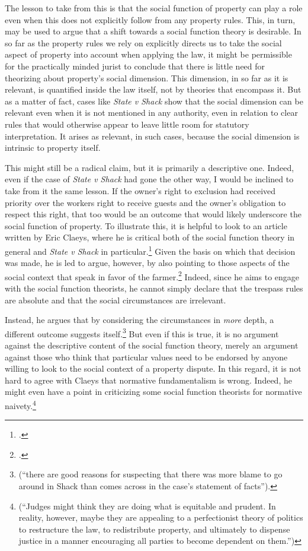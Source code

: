 \documentclass[12pt,a4paper]{book} %
\begin{document}
The lesson to take from this is that the social function of property can play a role even when this does not explicitly follow from any property rules. This, in turn, may be used to argue that a shift towards a social function theory is desirable. In so far as the property rules we rely on explicitly directs us to take the social aspect of property into account when applying the law, it might be permissible for the practically minded jurist to conclude that there is little need for theorizing about property's social dimension. This dimension, in so far as it is relevant, is quantified inside the law itself, not by theories that encompass it. But as a matter of fact, cases like {\it State v Shack} show that the social dimension can be relevant even when it is not mentioned in any authority, even in relation to clear rules that would otherwise appear to leave little room for statutory interpretation. It arises as relevant, in such cases, because the social dimension is intrinsic to property itself. 

This might still be a radical claim, but it is primarily a descriptive one. Indeed, even if the case of {\it State v Shack} had gone the other way, I would be inclined to take from it the same lesson. If the owner's right to exclusion had received priority over the workers right to receive guests and the owner's obligation to respect this right, that too would be an outcome that would likely underscore the social function of property. To illustrate this, it is helpful to look to an article written by Eric Claeys, where he is critical both of the social function theory in general and {\it State v Shack} in particular.\footcite{claeys09} Given the basis on which that decision was made, he is led to argue, however, by also pointing to those aspects of the social context that speak in favor of the farmer.\footnote{\cite[941-942]{claeys09}.} Indeed, since he aims to engage with the social function theorists, he cannot simply declare  that the trespass rules are absolute and that the social circumstances are irrelevant. 

Instead, he argues that by considering the circumstances in {\it more} depth, a different outcome suggests itself.\footnote{\cite[941]{claeys09} (``there are good reasons for suspecting that there was more blame to go around in Shack than comes across in the case's statement of facts'').} But even if this is true, it is no argument against the descriptive content of the social function theory, merely an argument against those who think that particular values need to be endorsed by anyone willing to look to the social context of a property dispute. In this regard, it is not hard to agree with Claeys that normative fundamentalism is wrong. Indeed, he might even have a point in criticizing some social function theorists for normative naivety.\footnote{\cite[945]{claeys09} (``Judges might think they are doing what is equitable and prudent. In reality, however, maybe
they are appealing to a perfectionist theory of politics to restructure the law, to redistribute property, and ultimately to dispense justice in a manner encouraging all parties to become dependent on them.'')} 
\end{document}
